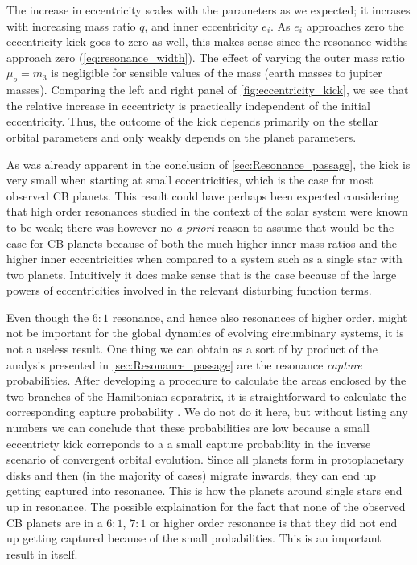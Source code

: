 \documentclass[ twoside,openright,titlepage,numbers=noenddot,headinclude,%
                footinclude=true,cleardoublepage=empty,abstractoff, %
                BCOR=5mm,paper=a4,fontsize=11pt,%
                american,%
                ]{scrreprt}
\begin{document}
The increase in eccentricity scales with the parameters as we expected;
it incrases with increasing mass ratio $q$, and inner eccentricity $e_i$.
As $e_i$ approaches zero the eccentricity kick goes to zero as well, this 
makes sense since the resonance widths approach zero 
(\cref{eq:resonance_width}).
The effect of varying the
outer mass ratio $\mu_o=m_3$ is negligible for sensible values
of the mass (earth masses to jupiter masses). Comparing the left and right 
panel of \cref{fig:eccentricity_kick}, we see that the relative increase
in eccentricty is practically independent of the initial eccentricity.
Thus, the outcome of the
kick depends primarily on the stellar orbital parameters and only weakly
depends on the planet parameters.

As was already apparent in the conclusion of \cref{sec:Resonance_passage}, the
kick is very small when starting at small eccentricities, which is the case for
most observed CB planets. This result could have perhaps been expected
considering that high order resonances studied in the context of the solar
system were known to be weak; there was however no \emph{a priori} reason to
assume that would be the case for CB planets because of both the
much higher inner mass ratios and the higher inner eccentricities when compared
to a system such as a single star with two planets. Intuitively it does make
sense that is the case because of the large powers of eccentricities involved
in the relevant disturbing function terms.

Even though the $6:1$ resonance, and hence also resonances of higher order, 
might not be important for the global dynamics of evolving circumbinary systems,
it is not a useless result. One thing we can obtain as a sort of by product
of the analysis presented in \cref{sec:Resonance_passage} are the resonance
\emph{capture} probabilities. After developing a procedure to calculate the
areas enclosed by the two branches of the Hamiltonian separatrix, it is 
straightforward to calculate the corresponding capture probability 
\citep{murray}. We do not do it here, but without listing any numbers we can
conclude that these probabilities are low because a small eccentricty
kick correponds to a a small capture probability in the inverse scenario
of convergent orbital evolution. Since all planets form in protoplanetary 
disks and then (in the majority of cases) migrate inwards, they can end
up getting captured into resonance. This is how the planets around single stars
end up in resonance. The possible explaination for the fact that none of the
observed CB planets are in a $6:1$, $7:1$ or higher order resonance
is that they did not end up getting captured because of the small probabilities.
This is an important result in itself.
\end{document}
